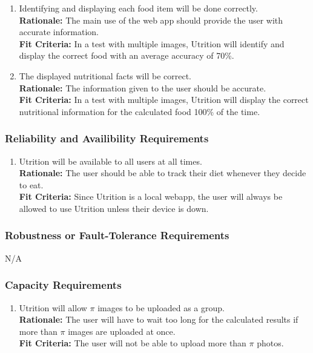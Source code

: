 \documentclass[12pt]{article}
\begin{document}
\begin{enumerate}[start=4,label={PR\arabic*.}]
	\item Identifying and displaying each food item will be done correctly. \\
	\textbf{Rationale:} The main use of the web app should provide the user with accurate information. \\
	\textbf{Fit Criteria:} In a test with multiple images, Utrition will identify and display the correct food with an average accuracy of 70\%.
	\item  The displayed nutritional facts will be correct. \\
	\textbf{Rationale:} The information given to the user should be accurate. \\
	\textbf{Fit Criteria:} In a test with multiple images, Utrition will display the correct nutritional information for the calculated food 100\% of the time.
\end{enumerate}

\subsubsection{Reliability and Availibility Requirements}

\begin{enumerate}[{PR}6. ] 
	\item Utrition will be available to all users at all times.\\
	\textbf{Rationale:} The user should be able to track their diet whenever they decide to eat. \\
	\textbf{Fit Criteria:} Since Utrition is a local webapp, the user will always be allowed to use Utrition unless their device is down.
\end{enumerate}

\subsubsection{Robustness or Fault-Tolerance Requirements}
\hspace{1.5cm}N/A

\subsubsection{Capacity Requirements}

\begin{enumerate}[{PR}7. ] 
	\item Utrition will allow $\pi$ images to be uploaded as a group.\\
	\textbf{Rationale:} The user will have to wait too long for the calculated results if more than $\pi$ images are uploaded at once. \\
	\textbf{Fit Criteria:} The user will not be able to upload more than $\pi$ photos.
\end{enumerate}
\end{document}
